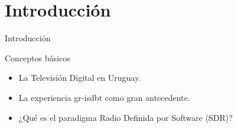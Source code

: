 \section{Introducción}

\begin{frame}{Introducción}
\begin{block}{Conceptos básicos}
	\begin{itemize}
		\item {	La Televisión Digital en Uruguay.}
		\item {	La experiencia gr-isdbt como gran antecedente. }
		\item {	¿Qué es el paradigma Radio Definida por Software (SDR)?	}
	\end{itemize}
\end{block}

\end{frame}
